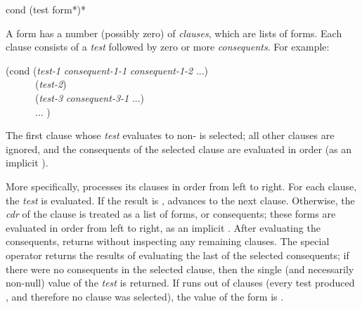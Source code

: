 \begin{defmac}
cond {(test {form}*)}*

A  form has a number (possibly zero) of
\emph{clauses}, which are lists of forms.
Each clause consists of a \emph{test} followed
by zero or more \emph{consequents}.
For example:
\begin{lisp}
(cond (\emph{test-1} \emph{consequent-1-1} \emph{consequent-1-2} ...) \\
~~~~~~(\emph{test-2}) \\
~~~~~~(\emph{test-3} \emph{consequent-3-1} ...) \\
~~~~~~... )
\end{lisp}

The first clause whose \emph{test} evaluates to non-{\false}
is selected; all other clauses are ignored, and the consequents
of the selected clause are evaluated in order (as an implicit ).

More specifically,  processes its clauses in order from left to
right.  For each clause, the \emph{test} is evaluated.  If the result is
{\false},  advances to the next clause.  Otherwise, the \emph{cdr} of
the clause is treated as a list of forms, or consequents; these forms are
evaluated in order from left to right, as an implicit .
After evaluating the consequents,
 returns without inspecting any remaining clauses.
The  special operator returns the results
of evaluating the last of the selected consequents;
if there were no consequents in
the selected clause,
then the single (and necessarily non-null) value of the \emph{test} is returned.
If  runs out of clauses (every test produced {\false},
and therefore no clause was selected), the value of the  form is
{\false}.


\end{defmac}
